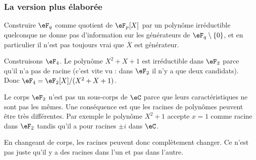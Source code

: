 \subsubsection{La version plus élaborée}

Construire \( \eF_q\) comme quotient de \( \eF_p[X]\) par un polynôme irréductible quelconque ne donne pas d'information sur les générateurs de \( \eF_q\setminus\{ 0 \}\), et en particulier il n'est pas toujours vrai que \( \overline X\) est générateur.

\begin{example}
	Construisons \( \eF_4\). Le polynôme \( X^2+X+1\) est irréductible dans \( \eF_2\) parce qu'il n'a pas de racine (c'est vite vu : dans \( \eF_2\) il n'y a que deux candidats). Donc \( \eF_4=\eF_2[X]/(X^2+X+1)\).
\end{example}

\begin{remark}
	Le corps \( \eF_2\) n'est pas un sous-corps de \( \eC\) parce que leurs caractéristiques ne sont pas les mêmes. Une conséquence est que les racines de polynômes peuvent être très différentes. Par exemple le polynôme \( X^2+1\) accepte \( x=1\) comme racine dans \( \eF_2\) tandis qu'il a pour racines \( \pm i\) dans \( \eC\).

	En changeant de corps, les racines peuvent donc complètement changer. Ce n'est pas juste qu'il y a des racines dans l'un et pas dans l'autre.
\end{remark}


